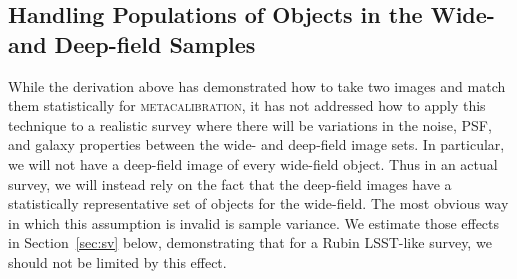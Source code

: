 \documentclass[twocolumn]{openjournal}
\makeatletter
\newcommand{\mcal}{\textsc{metacalibration}\@\xspace}
\makeatother
\begin{document}
\subsection{Handling Populations of Objects in the Wide- and Deep-field Samples}\label{sec:statmatch}

While the derivation above has demonstrated how to take two images and match them
statistically for \mcal, it has not addressed how to apply this technique to a realistic
survey where there will be variations in the noise, PSF, and galaxy properties between
the wide- and deep-field image sets. In particular, we will not have a deep-field image
of every wide-field object. Thus in an actual survey, we will instead rely on the fact
that the deep-field images have a statistically representative set of objects for the
wide-field. The most obvious way in which this assumption is invalid is sample variance.
We estimate those effects in Section~\ref{sec:sv} below, demonstrating that for a Rubin
LSST-like survey, we should not be limited by this effect.
\end{document}
